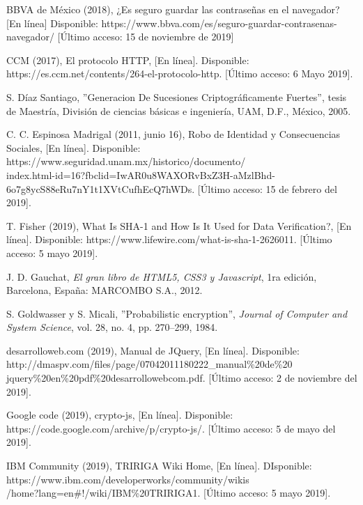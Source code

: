 \documentclass[12pt, a4paper, titlepage]{report}
\begin{document}
\begin{thebibliography}{20}
		BBVA de México (2018), ¿Es seguro guardar las contraseñas en el navegador? [En línea] Disponible: https://www.bbva.com/es/seguro-guardar-contrasenas-navegador/ [Último acceso: 15 de noviembre de 2019]   
	
        CCM (2017), El protocolo HTTP, [En línea]. Disponible: https://es.ccm.net/contents/264-el-protocolo-http. [Último acceso: 6 Mayo 2019].

        S. Díaz Santiago, ''Generacion De Sucesiones Criptográficamente Fuertes'', tesis de Maestría, División de ciencias básicas e ingeniería, UAM, D.F., México, 2005.
		
		C. C. Espinosa Madrigal (2011, junio 16), Robo de Identidad y Consecuencias Sociales, [En línea]. Disponible: https://www.seguridad.unam.mx/historico/documento/\\index.html-id=16?fbclid=IwAR0u8WAXORvBxZ3H-aMzlBhd-6o7g8ycS88eRu7nY1t1XVtCufhEcQ7hWDs. [Último acceso: 15 de febrero del 2019].
		
        T. Fisher (2019), What Is SHA-1 and How Is It Used for Data Verification?, [En línea]. Disponible: https://www.lifewire.com/what-is-sha-1-2626011. [Último acceso: 5 mayo 2019].
		
		J. D. Gauchat, \textit{El gran libro de HTML5, CSS3 y Javascript}, 1ra edición, Barcelona, España: MARCOMBO S.A., 2012. 
		
		S.  Goldwasser y S. Micali, ''Probabilistic encryption'', \textit{Journal  of Computer and System Science}, vol. 28, no. 4, pp. 270–299, 1984.
		
        desarrolloweb.com (2019), Manual de JQuery, [En línea]. Disponible: http://dmaspv.com/files/page/07042011180222\_manual\%20de\%20\\jquery\%20en\%20pdf\%20desarrollowebcom.pdf. [Último acceso: 2 de noviembre del 2019].
		
        Google code (2019), crypto-js, [En línea]. Disponible: https://code.google.com/archive/p/crypto-js/. [Último acceso: 5 de mayo del 2019].
		
        IBM Community (2019), TRIRIGA Wiki Home, [En línea]. DIsponible: 	https://www.ibm.com/developerworks/community/wikis\\
        /home?lang=en\#!/wiki/IBM\%20TRIRIGA1. [Último acceso: 5 mayo 2019].
        

\end{thebibliography}
\end{document}
